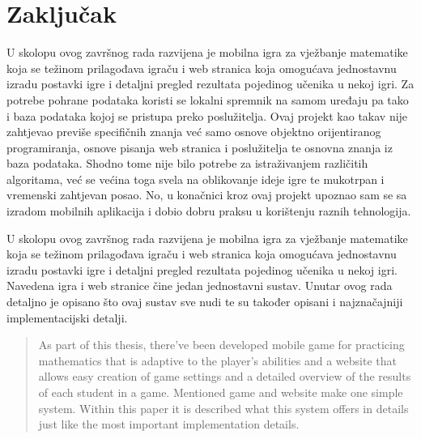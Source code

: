 \documentclass[times, utf8, zavrsni]{fer}
\begin{document}
\chapter{Zaključak}
U skolopu ovog završnog rada razvijena je mobilna igra za vježbanje matematike koja se težinom prilagođava igraču  i web stranica koja omogućava jednostavnu izradu
postavki igre i detaljni pregled rezultata pojedinog učenika u nekoj igri. Za potrebe pohrane podataka koristi se lokalni spremnik na samom uređaju pa tako i baza podataka kojoj se pristupa preko poslužitelja.
Ovaj projekt kao takav nije zahtjevao previše specifičnih znanja već samo osnove objektno orijentiranog programiranja, osnove pisanja web stranica i poslužitelja te osnovna znanja iz baza podataka. Shodno tome nije bilo 
potrebe za istraživanjem različitih algoritama, već se većina toga svela na oblikovanje ideje igre te mukotrpan i vremenski zahtjevan posao. No, u konačnici kroz ovaj projekt upoznao sam se sa izradom mobilnih aplikacija 
i dobio dobru praksu u korištenju raznih tehnologija.





\begin{sazetak}
U skolopu ovog završnog rada razvijena je mobilna igra za vježbanje matematike koja se težinom prilagođava igraču  i web stranica koja omogućava jednostavnu izradu
postavki igre i detaljni pregled rezultata pojedinog učenika u nekoj igri. Navedena igra i web stranice čine jedan jednostavni sustav. Unutar ovog rada detaljno je opisano što ovaj sustav sve nudi te su također opisani
i najznačajniji implementacijski detalji.

\end{sazetak}

\begin{abstract}
As part of this thesis, there've been developed mobile game for practicing mathematics that is adaptive to the player's abilities and a website that allows easy creation of game settings and a detailed overview of
the results of each student in a game. Mentioned game and website make one simple system. Within this paper it is described what this system offers in details just like the most important implementation details.

\end{abstract}
\end{document}
